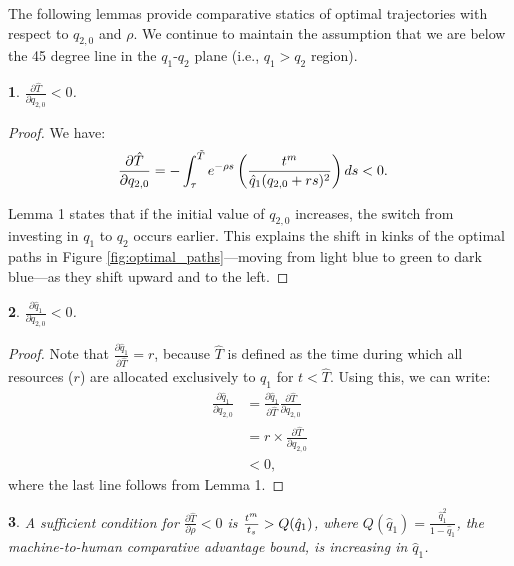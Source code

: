 \documentclass{article}
\theoremstyle{plain}
\newtheorem{lem}{\protect\lemmaname}
\newtheorem{lem}{\protect\lemmaname}[chapter]
\theoremstyle{plain}
\providecommand{\lemmaname}{Lemma}
\begin{document}
The following lemmas provide comparative statics of optimal trajectories with respect to $q_{2,0}$ and $\rho$.  
We continue to maintain the assumption that we are below the 45 degree line in the $q_{1}$-$q_{2}$ plane (i.e., $q_{1}>q_{2}$ region).
\begin{lem}
$\frac{\partial\hat{T}}{\partial q_{2,0}}<0$.
\end{lem}

\begin{proof}
We have:
\begin{align*}
\frac{\partial\hat{T}}{\partial q_{2,0}} & = -\int_{\tau}^{\tilde{T}} e^{-\rho s}\left(\frac{t^{m}_{}}{\hat{q}_{1}(q_{2,0}+rs)^{2}}\right)ds < 0.
\end{align*}

\noindent Lemma 1 states that if the initial value of $q_{2,0}$ increases, the switch from investing in $q_{1}$ to $q_{2}$ occurs earlier.  
This explains the shift in kinks of the optimal paths in Figure \ref{fig:optimal_paths}---moving from light blue to green to dark blue---as they shift upward and to the left.
\end{proof}

\begin{lem}
$\frac{\partial\hat{q}_{1}}{\partial q_{2,0}}<0$.
\end{lem}

\begin{proof}
Note that $\frac{\partial\hat{q}_{1}}{\partial\hat{T}}=r$, because $\hat{T}$ is defined as the time during which all resources ($r$) are allocated exclusively to $q_{1}$ for $t<\hat{T}$.  
Using this, we can write:
\begin{align*}
\frac{\partial\hat{q}_{1}}{\partial q_{2,0}} & =\frac{\partial\hat{q}_{1}}{\partial\hat{T}}\frac{\partial\hat{T}}{\partial q_{2,0}}\\[1ex]
 & = r \times \frac{\partial\hat{T}}{\partial q_{2,0}}\\[1ex]
 & < 0,
\end{align*}
where the last line follows from Lemma 1.
\end{proof}

\begin{lem}
A sufficient condition for $\frac{\partial\hat{T}}{\partial\rho}<0$ is $\frac{t^{m}_{}}{t_{s}}>Q(\hat{q}_{1})$, where $Q(\hat{q}_{1})=\frac{\hat{q}_{1}^{2}}{1-\hat{q}_{1}}$, the machine-to-human comparative advantage bound, is increasing in $\hat{q}_{1}$.
\end{lem}
\end{document}
